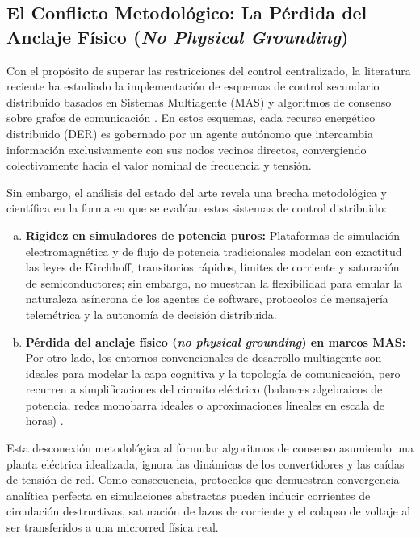 \subsection{El Conflicto Metodológico: La Pérdida del Anclaje Físico (\textit{No Physical Grounding})}
Con el propósito de superar las restricciones del control centralizado, la literatura reciente ha estudiado la implementación de esquemas de control secundario distribuido basados en Sistemas Multiagente (MAS) y algoritmos de consenso sobre grafos de comunicación \citep{Mamun2026, Altin2023MultiAgent}. En estos esquemas, cada recurso energético distribuido (DER) es gobernado por un agente autónomo que intercambia información exclusivamente con sus nodos vecinos directos, convergiendo colectivamente hacia el valor nominal de frecuencia y tensión.

Sin embargo, el análisis del estado del arte revela una brecha metodológica y científica en la forma en que se evalúan estos sistemas de control distribuido:
\begin{enumerate}[a)]
    \item \textbf{Rigidez en simuladores de potencia puros:} Plataformas de simulación electromagnética y de flujo de potencia tradicionales modelan con exactitud las leyes de Kirchhoff, transitorios rápidos, límites de corriente y saturación de semiconductores; sin embargo, no muestran la flexibilidad para emular la naturaleza asíncrona de los agentes de software, protocolos de mensajería telemétrica y la autonomía de decisión distribuida.
    \item \textbf{Pérdida del anclaje físico (\textit{no physical grounding}) en marcos MAS:} Por otro lado, los entornos convencionales de desarrollo multiagente son ideales para modelar la capa cognitiva y la topología de comunicación, pero recurren a simplificaciones del circuito eléctrico (balances algebraicos de potencia, redes monobarra ideales o aproximaciones lineales en escala de horas) \citep{Muszynski2026EnergyTwin, Khanna2025}.
\end{enumerate}

Esta desconexión metodológica al formular algoritmos de consenso asumiendo una planta eléctrica idealizada, ignora las dinámicas de los convertidores y las caídas de tensión de red. Como consecuencia, protocolos que demuestran convergencia analítica perfecta en simulaciones abstractas pueden inducir corrientes de circulación destructivas, saturación de lazos de corriente y el colapso de voltaje al ser transferidos a una microrred física real.

